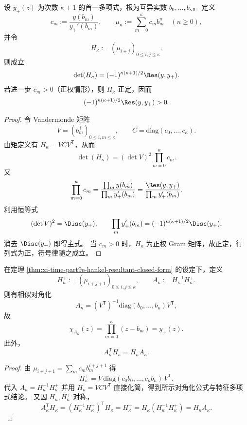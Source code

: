 \begin{theorem}\label{thm:xi-time-part9e-hankel-resultant-closed-form}
设 \(y_+(z)\) 为次数 \(\kappa+1\) 的首一多项式，根为互异实数 \(b_0,\dots,b_\kappa\)。
定义
\[
c_m:=\frac{y(b_m)}{y_+'(b_m)},\qquad
\mu_n:=\sum_{m=0}^{\kappa}c_m b_m^n\quad(n\ge 0),
\]
并令
\[
H_\kappa:=(\mu_{i+j})_{0\le i,j\le \kappa}.
\]
则成立
\[
\det(H_\kappa)=(-1)^{\kappa(\kappa+1)/2}\Res(y,y_+).
\]
若进一步 \(c_m>0\)（正权情形），则 \(H_\kappa\) 正定，因而
\[
(-1)^{\kappa(\kappa+1)/2}\Res(y,y_+)>0.
\]
\end{theorem}
\begin{proof}
令 Vandermonde 矩阵
\[
V=(b_m^{\,i})_{0\le i,m\le \kappa},\qquad
C=\mathrm{diag}(c_0,\dots,c_\kappa).
\]
由矩定义有 \(H_\kappa=VCV^{\mathsf T}\)，从而
\[
\det(H_\kappa)=(\det V)^2\prod_{m=0}^{\kappa}c_m.
\]
又
\[
\prod_{m=0}^{\kappa}c_m
=\frac{\prod_m y(b_m)}{\prod_m y_+'(b_m)}
=\frac{\Res(y,y_+)}{\prod_m y_+'(b_m)}.
\]
利用恒等式
\[
(\det V)^2=\Disc(y_+),\qquad
\prod_m y_+'(b_m)=(-1)^{\kappa(\kappa+1)/2}\Disc(y_+),
\]
消去 \(\Disc(y_+)\) 即得主式。
当 \(c_m>0\) 时，\(H_\kappa\) 为正权 Gram 矩阵，故正定，行列式为正，符号律随之成立。
\end{proof}

\begin{theorem}\label{thm:xi-time-part9e-shifted-hankel-pencil-diagonalization}
在定理 \ref{thm:xi-time-part9e-hankel-resultant-closed-form} 的设定下，定义
\[
H_\kappa^+:=(\mu_{i+j+1})_{0\le i,j\le \kappa},\qquad
A_\kappa:=H_\kappa^{-1}H_\kappa^+.
\]
则有相似对角化
\[
A_\kappa=(V^{\mathsf T})^{-1}\mathrm{diag}(b_0,\dots,b_\kappa)V^{\mathsf T},
\]
故
\[
\chi_{A_\kappa}(z)=\prod_{m=0}^{\kappa}(z-b_m)=y_+(z).
\]
此外，
\[
A_\kappa^{\mathsf T}H_\kappa=H_\kappa A_\kappa.
\]
\end{theorem}
\begin{proof}
由 \(\mu_{i+j+1}=\sum_m c_m b_m^{i+j+1}\) 得
\[
H_\kappa^+=V\,\mathrm{diag}(c_0b_0,\dots,c_\kappa b_\kappa)\,V^{\mathsf T}.
\]
代入 \(A_\kappa=H_\kappa^{-1}H_\kappa^+\) 并用 \(H_\kappa=VCV^{\mathsf T}\) 直接化简，得到所示对角化公式与特征多项式结论。
又因 \(H_\kappa,H_\kappa^+\) 对称，
\[
A_\kappa^{\mathsf T}H_\kappa
=(H_\kappa^{-1}H_\kappa^+)^{\mathsf T}H_\kappa
=H_\kappa^+
=H_\kappa(H_\kappa^{-1}H_\kappa^+)
=H_\kappa A_\kappa.
\]
\end{proof}


